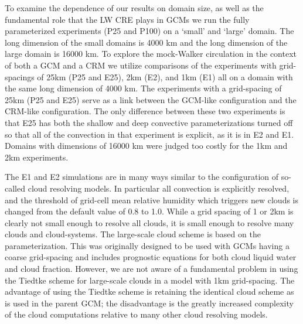 \documentclass[draft]{agujournal2019}
\begin{document}
To examine the dependence of our results on domain size, as well as the fundamental role that the LW CRE plays in GCMs
we run the fully parameterized experiments (P25 and P100) on a `small' and `large' domain.  The long dimension of the small domains is 4000 km and the long dimension of the large domain is 16000 km.  
To explore the mock-Walker circulation in the context of both a GCM and a CRM we utilize 
comparisons of the experiments with grid-spacings of 25km (P25 and E25), 2km (E2), and 1km (E1) all on a domain with the same long dimension 
of 4000 km.  The experiments with a grid-spacing of 25km (P25 and E25) serve as a link between the GCM-like configuration and the CRM-like 
configuration.  The only difference between these two experiments is that E25 has both the shallow and deep convective parameterizations turned 
off so that all of the convection in that experiment is explicit, as it is in E2 and E1.  Domains with dimensions of 16000 km were judged too 
costly for the 1km and 2km experiments.  

The E1 and E2 simulations are in many ways similar to the configuration of so-called cloud resolving models.  
In particular all convection is explicitly resolved, 
and the threshold of grid-cell mean relative humidity which triggers new clouds is changed from the default value of 0.8 to 1.0.  
While a grid spacing of 1 or 2km is clearly not small enough
to resolve all clouds, it is small enough to resolve many clouds and cloud-systems.  
The large-scale cloud scheme is based on the  parameterization.  
This was originally designed to be used with GCMs having a coarse grid-spacing and includes prognostic equations for both 
cloud liquid water and cloud fraction.  
However, we are not aware of a fundamental problem in using the Tiedtke scheme for large-scale clouds in a model with 1km grid-spacing.   
The advantage of using the Tiedtke scheme is retaining the identical cloud scheme as is used in the parent GCM; the disadvantage is the greatly increased complexity of the 
cloud computations relative to many other cloud resolving models.    
\end{document}
